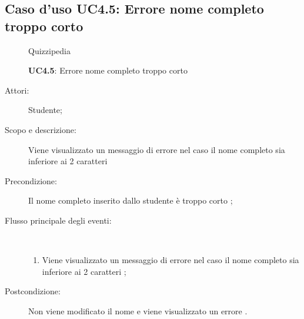 \subsection{Caso d'uso UC4.5: Errore nome completo troppo corto}
	\begin{figure}[H]
		\centering
		\begin{resizedtikzpicture}{\textwidth}
		\begin{umlsystem}[x=0, fill=lightgray!20]{Quizzipedia}
		\end{umlsystem}
		\end{resizedtikzpicture}
		\caption{\textbf{UC4.5}: Errore nome completo troppo corto}
		\label{UC4.5}
	\end{figure}
\begin{description}
\item[Attori:] Studente;
\item[Scopo e descrizione:] Viene visualizzato un messaggio di errore nel caso il nome completo sia inferiore ai 2 caratteri

      \item[Precondizione:] Il nome completo inserito dallo studente è troppo corto
;

        \item[Flusso principale degli eventi:] \ 
 \begin{enumerate}
          \item Viene visualizzato un messaggio di errore nel caso il nome completo sia inferiore ai 2 caratteri	;

      \end{enumerate}
    \item[Postcondizione:] Non viene modificato il nome e viene visualizzato un errore
.
  \end{description}
\hypertarget{UC4.6}{}
